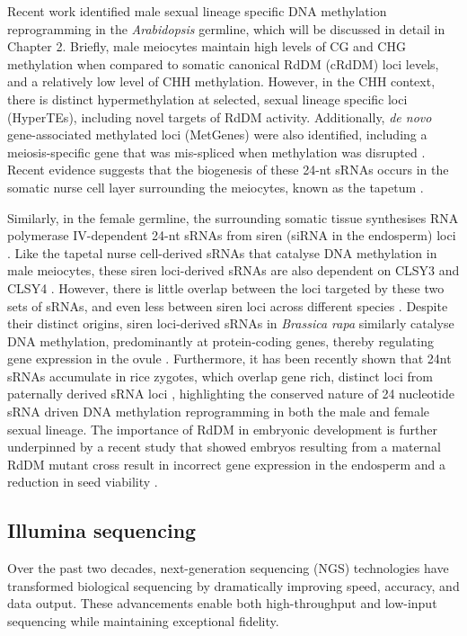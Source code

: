 Recent work identified male sexual lineage specific DNA methylation reprogramming in the \textit{Arabidopsis} germline, which will be discussed in detail in Chapter 2. Briefly, male meiocytes maintain high levels of CG and CHG methylation when compared to somatic canonical RdDM (cRdDM) loci levels, and a relatively low level of CHH methylation. However, in the CHH context, there is distinct hypermethylation at selected, sexual lineage specific loci (HyperTEs), including novel targets of RdDM activity. Additionally, \textit{de novo} gene-associated methylated loci (MetGenes) were also identified, including a meiosis-specific gene that was mis-spliced when methylation was disrupted \cite{RN199}. Recent evidence suggests that the biogenesis of these 24-nt sRNAs occurs in the somatic nurse cell layer surrounding the meiocytes, known as the tapetum \cite{RN187}. 

Similarly, in the female germline, the surrounding somatic tissue synthesises RNA polymerase IV-dependent 24-nt sRNAs from siren (siRNA in the endosperm) loci \cite{RN164,RN163,RN162}. Like the tapetal nurse cell-derived sRNAs that catalyse DNA methylation in male meiocytes, these siren loci-derived sRNAs are also dependent on CLSY3 and CLSY4 \cite{RN162}. However, there is little overlap between the loci targeted by these two sets of sRNAs, and even less between siren loci across different species \cite{RN163}. Despite their distinct origins, siren loci-derived sRNAs in \textit{Brassica rapa} similarly catalyse DNA methylation, predominantly at protein-coding genes, thereby regulating gene expression in the ovule \cite{RN165}. Furthermore, it has been recently shown that 24nt sRNAs accumulate in rice zygotes, which overlap gene rich, distinct loci from paternally derived sRNA loci \cite{RN166}, highlighting the conserved nature of 24 nucleotide sRNA driven DNA methylation reprogramming in both the male and female sexual lineage. The importance of RdDM in embryonic development is further underpinned by a recent study that showed embryos resulting from a maternal RdDM mutant cross result in incorrect gene expression in the endosperm and a reduction in seed viability \cite{RN167}.

\subsection{Illumina sequencing}

Over the past two decades, next-generation sequencing (NGS) technologies have transformed biological sequencing by dramatically improving speed, accuracy, and data output. These advancements enable both high-throughput and low-input sequencing while maintaining exceptional fidelity.

